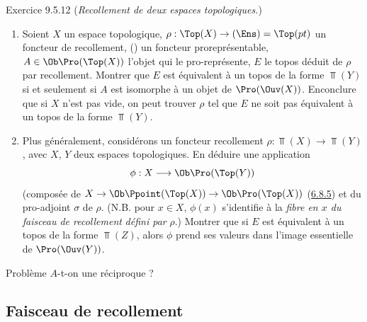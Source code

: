 \begin{enonce*}[remark]{Exercice 9.5.12}
(\emph{Recollement de deux espaces topologiques.})
\begin{enumerate}
\renewcommand{\theenumi}{\alph{enumi}}
\renewcommand{\labelenumi}{\theenumi)}
\item Soient $X$ un espace topologique, $\rho:\Top(X)\rightarrow
(\Ens)=\Top(pt)$ un foncteur de recollement, \ie () un
foncteur proreprésentable, $A\in \Ob \Pro(\Top(X))$ l'objet qui le
pro-représente, $E$ le topos déduit de $\rho$ par recollement.
Montrer que $E$ est équivalent à un topos de la forme $\Top(Y)$ si
et seulement si $A$ est isomorphe à un objet de $\Pro(\Ouv(X))$.
En\pageoriginale conclure que si $X$ n'est pas vide, on peut trouver
$\rho$ tel que $E$ ne soit pas équivalent à un topos de la forme
$\Top(Y)$.

\item Plus généralement, considérons un foncteur recollement
$\rho:\Top(X)\rightarrow \Top(Y)$, avec $X$, $Y$ deux espaces
topologiques. En déduire une application
$$
\phi:X\longrightarrow \Ob \Pro(\Top(Y))
$$
(composée de $X\rightarrow \Ob \Ppoint(\Top(X))\rightarrow
\Ob\Pro(\Top(X))$ (\hyperref[IV.subsubsec6.8.5]{6.8.5}) et du pro-adjoint
$\sigma$ de $\rho$. (N.B. pour $x\in X$, $\phi(x)$ s'identifie à la
\emph{fibre en $x$ du faisceau de recollement} 
\emph{défini par} $\rho$.) Montrer que si $E$ est équivalent à un
topos de la forme $\Top(Z)$, alors $\phi$ prend ses valeurs dans
l'image essentielle de $\Pro(\Ouv(Y))$.
\end{enumerate}
\end{enonce*}

\begin{enonce*}[remark]{Problème}
$A$-t-on une réciproque ?
\end{enonce*}

\subsection{Faisceau de recollement}


